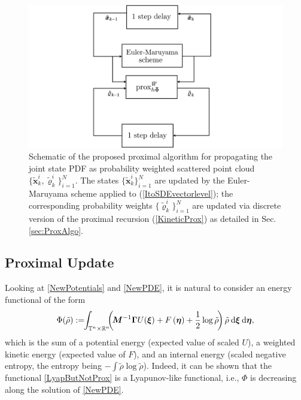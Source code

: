 \documentclass[10pt,twocolumn]{IEEEtran}
\newcommand{\differential}{{\rm{d}}}
\begin{document}
\begin{figure}[t]
\centering
\includegraphics[width=.6\linewidth]{BlockDiagm.pdf}
\caption{\small{Schematic of the proposed proximal algorithm for propagating the joint state PDF as probability weighted scattered point cloud $\{\tilde{\bm{x}}_{k}^{i},\tilde{\varrho}_{k}^{i}\}_{i=1}^{N}$. The states $\{\tilde{\bm{x}}_{k}^{i}\}_{i=1}^{N}$ are updated by the Euler-Maruyama scheme applied to (\ref{ItoSDEvectorlevel}); the corresponding probability weights $\{\tilde{\varrho}_{k}^{i}\}_{i=1}^{N}$ are updated via discrete version of the proximal recursion (\ref{KineticProx}) as detailed in Sec. \ref{sec:ProxAlgo}.}}
\label{fig:BlockDiagm}
\vspace*{-0.2in}
\end{figure}



\subsection{Proximal Update}\label{subsec:ProxUpdate}
Looking at \eqref{NewPotentials} and \eqref{NewPDE}, it is natural to consider an energy functional of the form
\begin{align}
\Phi(\tilde{\rho}) := \!\!\displaystyle\int_{\mathbb{T}^{n}\times\mathbb{R}^{n}}\!\!\!\left(\!\bm{M}^{-1}\bm{\Gamma}U(\bm{\xi})+ F\left(\bm{\eta}\right) + \frac{1}{2}\log\tilde{\rho}\!\right)\tilde{\rho}\:\differential\bm{\xi}\:\differential\bm{\eta},
\label{LyapButNotProx}	
\end{align}
which is the sum of a potential energy (expected value of scaled $U$), a weighted kinetic energy (expected value of $F$), and an internal energy (scaled negative entropy, the entropy being $-\int\tilde{\rho}\log\tilde{\rho}$). Indeed, it can be shown \cite[Appendix A]{halder2021stochasticExpanded} that the functional \eqref{LyapButNotProx} is a Lyapunov-like functional, i.e., $\Phi$ is decreasing along the solution of \eqref{NewPDE}.
\end{document}
